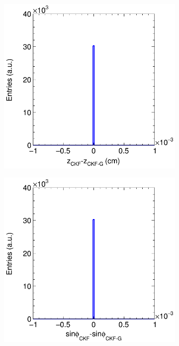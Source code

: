 \begin{figure}[t]
\begin{subfigure}{0.32\textwidth}
         \caption{}
         \label{fig:diff0_Integration}
     \end{subfigure}
    \begin{subfigure}{0.32\textwidth}
         \centering
         \includegraphics[width=\textwidth]{figures/ch5-KF_NDGAr/FullSample/Integration/ParDiffP1.png}
         \caption{}
         \label{fig:diff1_Integration}
     \end{subfigure}
          \begin{subfigure}{0.32\textwidth}
         \centering
         \includegraphics[width=\textwidth]{figures/ch5-KF_NDGAr/FullSample/Integration/ParDiffP2.png}

\end{subfigure}
\end{figure}
